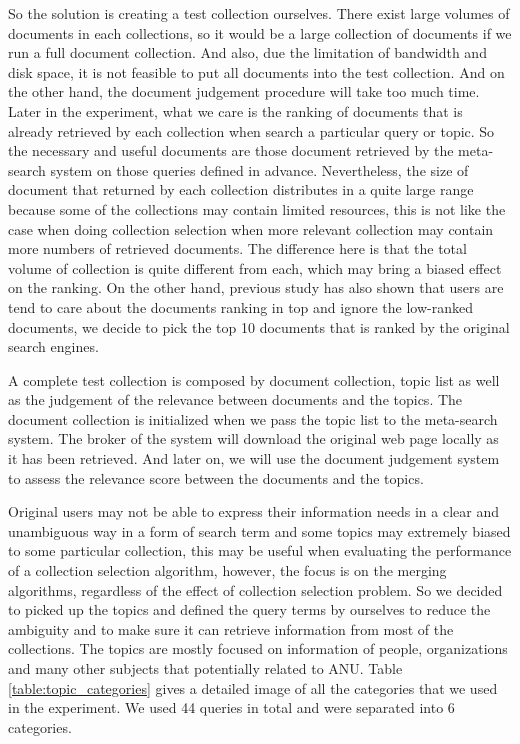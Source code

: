 So the solution is creating a test collection ourselves. There exist large volumes of documents in each collections, so it would be a large collection of documents if we run a full document collection. And also, due the limitation of bandwidth and disk space, it is not feasible to put all documents into the test collection. And on the other hand, the document judgement procedure will take too much time. Later in the experiment, what we care is the ranking of documents that is already retrieved by each collection when search a particular query or topic. So the necessary and useful documents are those document retrieved by the meta-search system on those queries defined in advance. Nevertheless, the size of document that returned by each collection distributes in a quite large range because some of the collections may contain limited resources, this is not like the case when doing collection selection when more relevant collection may contain more numbers of retrieved documents. The difference here is that the total volume of collection is quite different from each, which may bring a biased effect on the ranking. On the other hand, previous study \cite{Guan2007} has also shown that users are tend to care about the documents ranking in top and ignore the low-ranked documents, we decide to pick the top 10 documents that is ranked by the original search engines. 

A complete test collection is composed by document collection, topic list as well as the judgement of the relevance between documents and the topics. The document collection is initialized when we pass the topic list to the meta-search system. The broker of the system will download the original web page locally as it has been retrieved. And later on, we will use the document judgement system to assess the relevance score between the documents and the topics.

Original users may not be able to express their information needs in a clear and unambiguous way in a form of search term and some topics may extremely biased to some particular collection, this may be useful when evaluating the performance of a collection selection algorithm, however, the focus is on the merging algorithms, regardless of the effect of collection selection problem. So we decided to picked up the topics and defined the query terms by ourselves to reduce the ambiguity and to make sure it can retrieve information from most of the collections. The topics are mostly focused on information of people, organizations and many other subjects that potentially related to ANU. Table \ref{table:topic_categories} gives a detailed image of all the categories that we used in the experiment. We used 44 queries in total and were separated into 6 categories. 

